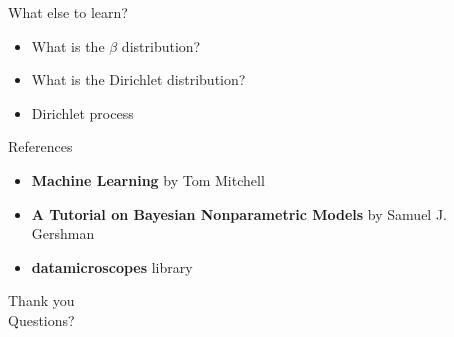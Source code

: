 \documentclass[handout]{beamer}
\begin{document}

\begin{frame}{What else to learn?}
    \begin{itemize}
        \item What is the $\beta$ distribution?
        \item What is the Dirichlet distribution?
        \item Dirichlet process
    \end{itemize}
\end{frame}

\begin{frame}{References}
    \begin{itemize}
        \item \textbf{Machine Learning} by Tom Mitchell
        \item \textbf{A Tutorial on Bayesian Nonparametric Models} by Samuel J. Gershman
        \item \textbf{datamicroscopes} library
    \end{itemize}
\end{frame}

\begin{frame}
\huge{Thank you}\\
\huge{Questions?}\\
\end{frame}
\end{document}
